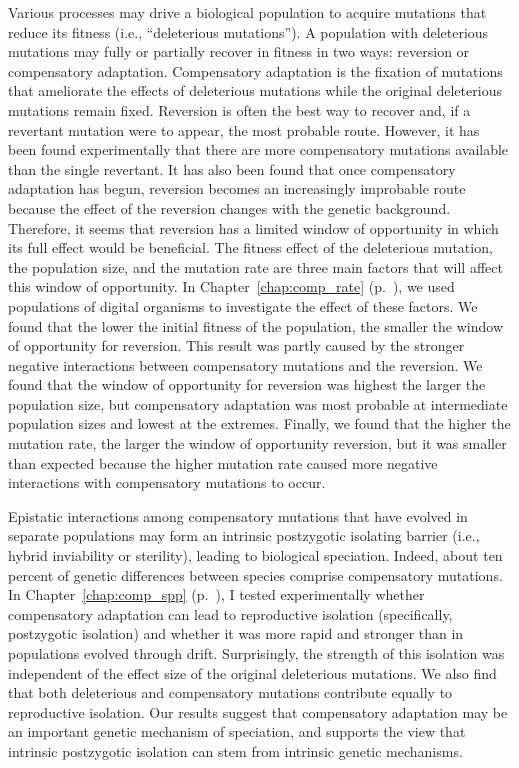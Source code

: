 \begin{doublespace}
Various processes may drive a biological population to acquire mutations
that reduce its fitness (i.e., ``deleterious mutations'').
%
A population with deleterious mutations may fully or partially recover
in fitness in two ways: reversion or compensatory adaptation.
%
Compensatory adaptation is the fixation of mutations
that ameliorate the effects of deleterious mutations
while the original deleterious mutations remain fixed.
%
Reversion is often the best way to recover and,
if a revertant mutation were to appear, the most probable route.
%
However, it has been found experimentally that
there are more compensatory mutations available
than the single revertant.
%
It has also been found that once compensatory adaptation
has begun, reversion becomes an increasingly improbable route
because the effect of the reversion changes with the genetic background.
%
Therefore, it seems that reversion has a limited
window of opportunity in which its full effect would be beneficial.
%
The fitness effect of the deleterious mutation,
the population size, and the mutation rate are three main factors
that will affect this window of opportunity.
%
In Chapter~\ref{chap:comp_rate} (p.~\pageref{chap:comp_rate}),
we used populations of digital organisms
to investigate the effect of these factors.
%
We found that the lower the initial fitness of the population,
the smaller the window of opportunity for reversion.
%
This result was partly caused by the stronger negative interactions
between compensatory mutations and the reversion.
%
We found that the window of opportunity for reversion
was highest the larger the population size,
but compensatory adaptation was most probable
at intermediate population sizes and lowest at the extremes.
%
Finally, we found that the higher the mutation rate,
the larger the window of opportunity reversion,
but it was smaller than expected because
the higher mutation rate caused more negative interactions
with compensatory mutations to occur.



Epistatic interactions among compensatory mutations that have
evolved in separate populations may form an intrinsic
postzygotic isolating barrier (i.e., hybrid inviability or sterility),
leading to biological speciation.
%
Indeed, about ten percent of genetic differences between species
comprise compensatory mutations.
%
In Chapter~\ref{chap:comp_spp} (p.~\pageref{chap:comp_spp}),
I tested experimentally whether compensatory adaptation
can lead to reproductive isolation (specifically, postzygotic isolation)
and whether it was more rapid and stronger
than in populations evolved through drift.
%
Surprisingly, the strength of this isolation was independent
of the effect size of the original deleterious mutations.
%
We also find that
both deleterious and compensatory mutations
contribute equally to reproductive isolation.
%
Our results suggest that compensatory adaptation may be
an important genetic mechanism of speciation,
and supports the view that intrinsic postzygotic isolation
can stem from intrinsic genetic mechanisms.




\end{doublespace}
